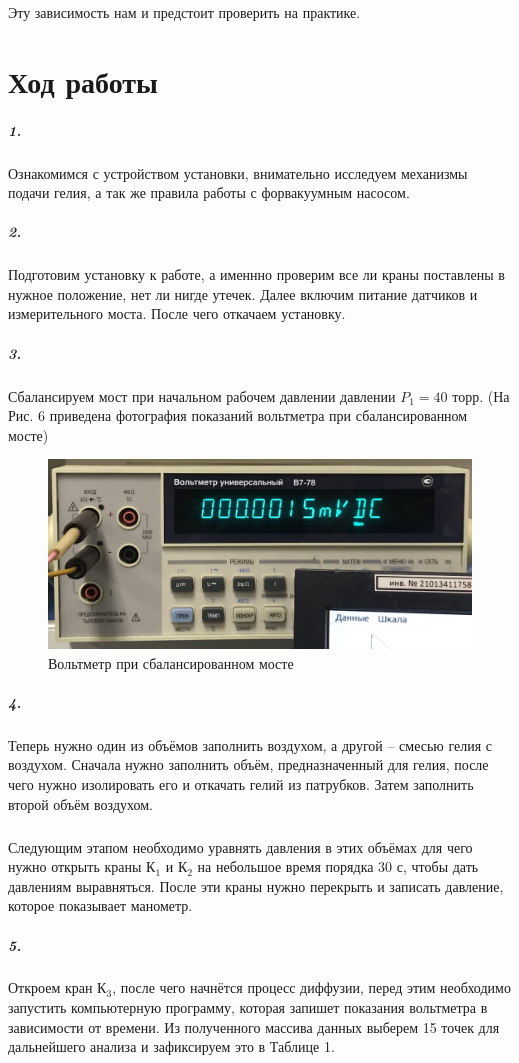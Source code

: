 \documentclass[a4paper,12pt]{article}
\begin{document}
Эту зависимость нам и предстоит проверить на практике. 
 	

\newpage

\section*{Ход работы}

\subparagraph*{1.}Ознакомимся с устройством установки, внимательно исследуем механизмы подачи гелия, а так же правила работы с форвакуумным насосом. 

\subparagraph*{2.} Подготовим установку к работе, а именнно проверим все ли краны поставлены в нужное положение, нет ли нигде утечек. Далее включим питание датчиков и измерительного моста. После чего откачаем установку. 


\subparagraph*{3.}  Сбалансируем мост при начальном рабочем давлении давлении $P_1 = 40$ торр. (На Рис. 6 приведена фотография показаний вольтметра при сбалансированном мосте)


\begin{figure} 
	\centering 
	\includegraphics[scale=0.057]{br.jpg} 
	\caption{Вольтметр при сбалансированном мосте} 
\end{figure}


\subparagraph*{4.} Теперь нужно один из объёмов заполнить воздухом, а другой -- смесью гелия с воздухом. Сначала нужно заполнить объём, предназначенный для гелия, после чего нужно изолировать его и откачать гелий из патрубков. Затем заполнить второй объём воздухом.

\subparagraph*{} Следующим этапом необходимо уравнять давления в этих объёмах для чего нужно открыть краны $К_1$ и $К_2$ на небольшое время порядка 30 с, чтобы дать давлениям выравняться. После эти краны нужно перекрыть и записать давление, которое показывает манометр. 




\subparagraph*{5.} Откроем кран $К_3$, после чего начнётся процесс диффузии, перед этим необходимо запустить компьютерную программу, которая запишет показания вольтметра в зависимости от времени.  Из полученного массива данных выберем 15 точек для дальнейшего анализа и зафиксируем это в Таблице 1.
\end{document}
